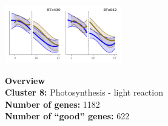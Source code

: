 \begin{multicols}{2}
\includegraphics[width=2in]{figures/clusters/leaf_Preflowering_7.png}
\columnbreak

\noindent \textbf{Overview}\\\textbf{Cluster 8:} Photosynthesis - light reaction \\
\textbf{Number of genes:} 1182 \\
\textbf{Number of ``good'' genes:} 622 \\
\end{multicols}

